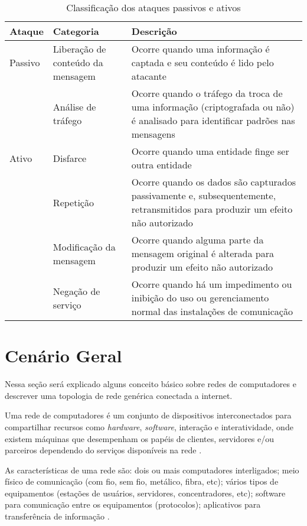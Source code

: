 \begin{table}[htb]
\ABNTEXfontereduzida
\centering
\caption{Classificação dos ataques passivos e ativos}
\label{tab:tipos-de-ataques}
\begin{tabular}{|l|l|p{7cm}|}
    \hline
    \textbf{Ataque} & \textbf{Categoria} & \textbf{Descrição} \\
    \hline
    Passivo & Liberação de conteúdo da mensagem & Ocorre quando uma informação é captada e seu conteúdo é lido pelo atacante \\ 
    \hline
            & Análise de tráfego & Ocorre quando o tráfego da troca de uma informação (criptografada ou não) é analisado para identificar padrões nas mensagens \\
    \hline
    Ativo & Disfarce & Ocorre quando uma entidade finge ser outra entidade \\
    \hline
          & Repetição & Ocorre quando os dados são capturados passivamente e, subsequentemente, retransmitidos para produzir um efeito não autorizado \\
    \hline
          & Modificação da mensagem & Ocorre quando alguma parte da mensagem original é alterada para produzir um efeito não autorizado \\
    \hline
          & Negação de serviço & Ocorre quando há um impedimento ou inibição do uso ou gerenciamento normal das instalações de comunicação \\
    \hline
\end{tabular}
\end{table}

\section{Cenário Geral} \label{sec:cenario-geral}

Nessa seção será explicado alguns conceito básico sobre redes de computadores e descrever uma topologia de rede genérica conectada a internet.

Uma rede de computadores é um conjunto de dispositivos interconectados para compartilhar recursos como \textit{hardware}, \textit{software}, interação e interatividade, onde existem máquinas que desempenham os papéis de clientes, servidores e/ou parceiros dependendo do serviços disponíveis na rede \cite{modelo:jose}.

As características de uma rede são: dois ou mais computadores interligados; meio físico de comunicação (com fio, sem fio, metálico, fibra, etc); vários tipos de equipamentos (estações de usuários, servidores, concentradores, etc); software para comunicação entre os equipamentos (protocolos); aplicativos para transferência de informação \cite{esr:arquitetura}.

